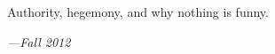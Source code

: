 Authority, hegemony, and why nothing is funny.

\begin{flushright}
\textit{---Fall 2012}
\end{flushright}





\groupendnotes

